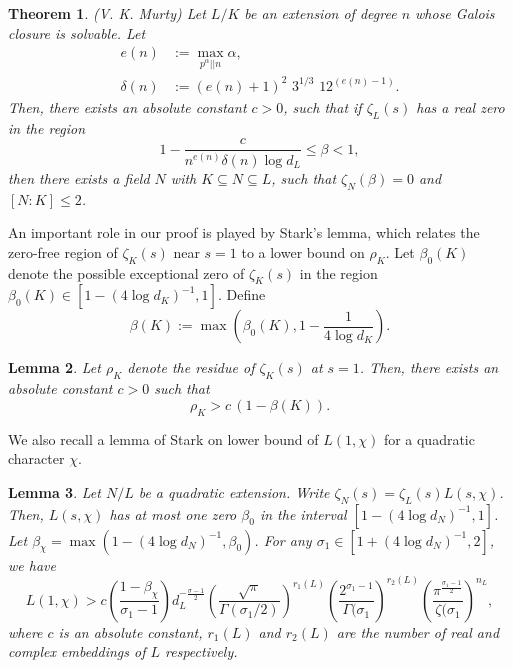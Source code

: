 \documentclass[12pt]{amsart}
\newtheorem{theorem}{Theorem}[section]
\newtheorem{lemma}[theorem]{Lemma}
\theoremstyle{definition}
\begin{document}
\begin{theorem}\label{Km}(V. K. Murty)
Let $L/K$ be an extension of degree $n$ whose Galois closure is solvable. Let
\begin{align*}
e(n) & := \max_{p^\alpha || n} \alpha, \\
\delta(n) & := (e(n) + 1)^2 \, \, 3^{1/3} \, \, 12^{(e(n) -1)}.
\end{align*}
Then, there exists an absolute constant $c>0$, such that if $\zeta_L(s)$ has a real zero in the region
\begin{equation}\label{region}
1 - \frac{c}{n^{e(n)} \delta(n) \log d_L} \leq \beta < 1,
\end{equation}
then there exists a field $N$ with $K\subseteq N\subseteq L$, such that $\zeta_N(\beta) = 0$ and $[N:K]\leq 2$.
\end{theorem}
\medskip

An important role in our proof is played by Stark's lemma, which relates the zero-free region of $\zeta_K(s)$ near $s=1$ to a lower bound on $\rho_K$. Let $\beta_0(K)$ denote the possible exceptional zero of $\zeta_K(s)$ in the region $\beta_0(K) \in [1-(4\log d_K)^{-1}, 1]$. Define 
\begin{equation}\label{beta_0-beta}
    \beta(K):= \max\left(\beta_0(K), 1-\frac{1}{4\log d_K}\right).
\end{equation}

\begin{lemma}\label{Stark's lemma}
    Let $\rho_K$ denote the residue of $\zeta_K(s)$ at $s=1$.  Then, there exists an absolute constant $c>0$ such that
    \begin{equation*}
        \rho_K > c\, (1-\beta(K)).
    \end{equation*}
\end{lemma}

We also recall a lemma of Stark \cite[Lemma 5]{Stk} on lower bound of $L(1,\chi)$ for a quadratic character $\chi$.
\begin{lemma}\label{Stark-L(1,chi)}
    Let $N/L$ be a quadratic extension. Write $\zeta_N(s) = \zeta_L(s) L(s,\chi)$. Then, $L(s,\chi)$ has at most one zero $\beta_0$ in the interval $[1-(4\log d_N)^{-1}, 1]$. Let $\beta_{\chi} = \max(1-(4\log d_N)^{-1}, \beta_0)$. For any $\sigma_1 \in [1+ (4\log d_N)^{-1}, 2]$, we have
    \begin{equation*}
        L(1,\chi) > c \left(\frac{1-\beta_{\chi}}{\sigma_1 -1}\right) d_L^{-\frac{\sigma-1}{2}} \left(\frac{\sqrt{\pi}}{\Gamma(\sigma_1/2)}\right)^{r_1(L)}\left(\frac{2^{\sigma_1-1}}{\Gamma(\sigma_1}\right)^{r_2(L)} \left(\frac{\pi^{\frac{\sigma_1-1}{2}}}{\zeta(\sigma_1}\right)^{n_L},
    \end{equation*}
    where $c$ is an absolute constant, $r_1(L)$ and $r_2(L)$ are the number of real and complex embeddings of $L$ respectively.
    
\end{lemma}
\end{document}
